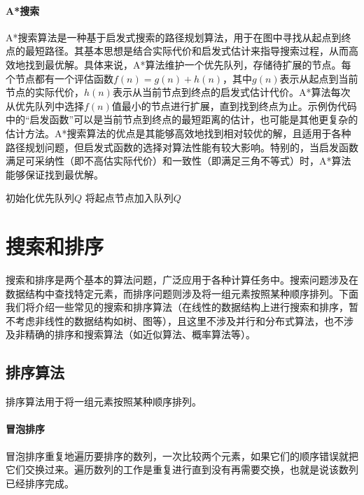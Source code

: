 \paragraph{A*搜索} A*搜索算法是一种基于启发式搜索的路径规划算法，用于在图中寻找从起点到终点的最短路径。其基本思想是结合实际代价和启发式估计来指导搜索过程，从而高效地找到最优解。具体来说，A*算法维护一个优先队列，存储待扩展的节点。每个节点都有一个评估函数$f(n) = g(n) + h(n)$，其中$g(n)$表示从起点到当前节点的实际代价，$h(n)$表示从当前节点到终点的启发式估计代价。A*算法每次从优先队列中选择$f(n)$值最小的节点进行扩展，直到找到终点为止。示例伪代码中的“启发函数”可以是当前节点到终点的最短距离的估计，也可能是其他更复杂的估计方法。A*搜索算法的优点是其能够高效地找到相对较优的解，且适用于各种路径规划问题，但启发式函数的选择对算法性能有较大影响。特别的，当启发函数满足可采纳性（即不高估实际代价）和一致性（即满足三角不等式）时，A*算法能够保证找到最优解。
\begin{algorithm}[htbp]
    \caption{A*搜索算法解决TSP问题的伪代码}\label{alg:a-star}
    初始化优先队列$Q$\;
    将起点节点加入队列$Q$\;
\end{algorithm}

\section{搜索和排序}

搜索和排序是两个基本的算法问题，广泛应用于各种计算任务中。搜索问题涉及在数据结构中查找特定元素，而排序问题则涉及将一组元素按照某种顺序排列。下面我们将介绍一些常见的搜索和排序算法（在线性的数据结构上进行搜索和排序，暂不考虑非线性的数据结构如树、图等），且这里不涉及并行和分布式算法，也不涉及非精确的排序和搜索算法（如近似算法、概率算法等）。

\subsection{排序算法}

排序算法用于将一组元素按照某种顺序排列。

\paragraph{冒泡排序} 冒泡排序重复地遍历要排序的数列，一次比较两个元素，如果它们的顺序错误就把它们交换过来。遍历数列的工作是重复进行直到没有再需要交换，也就是说该数列已经排序完成。

